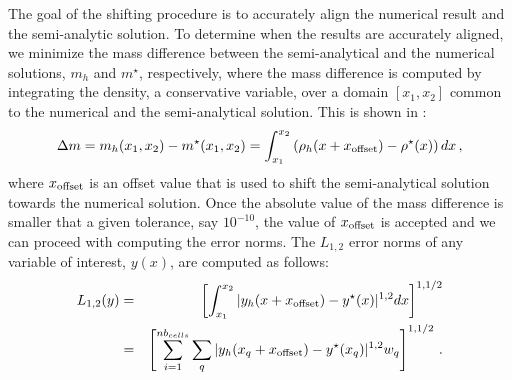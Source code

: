\documentclass[times,doublespace]{fldauth}%
\begin{document}
The goal of the shifting procedure is to accurately align the numerical result and the semi-analytic solution.
To determine when the results are accurately aligned, we minimize the mass difference between the semi-analytical and the numerical solutions, $m_h$ and $m^\star$, respectively, where the mass difference is computed by integrating the density, a conservative variable, over a domain $[x_1, x_2]$ common to the numerical and the semi-analytical solution.
This is shown in :
%
\begin{equation}\label{eq:mass-diff}
\Delta m = m_h(x_1,x_2) - m^\star(x_1,x_2) = \int_{x_1}^{x_2} \left( \rho_h (x+x_{\text{\text{offset}}}) - \rho^\star (x)\right) dx \, ,
\end{equation}
%
where $x_{\text{\text{offset}}}$ is an offset value that is used to shift the semi-analytical solution towards the numerical solution. Once the absolute value of the mass difference is smaller that a given tolerance, say $10^{-10}$, the value of $x_{\text{\text{offset}}}$ is accepted and we can proceed with computing the error norms. The $L_{1,2}$ error norms of any variable of interest, $y(x)$, are computed as follows:
%
\begin{eqnarray}\label{eq:l1-error-norm}
L_{1,2}(y) &=& \left[ \int_{x_1}^{x_2} | y_h(x+x_{\text{\text{offset}}}) - y^\star(x) |^{1,2} dx \right]^{1,1/2} \nonumber \\ 
&=& \left[ \sum_{i=1}^{nb_{cells}} \sum_{q} | y_h(x_q+x_{\text{\text{offset}}}) - y^\star(x_q) |^{1,2} w_q \right]^{1,1/2} \, .
\end{eqnarray}
%
\end{document}
